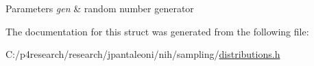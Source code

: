 \begin{DoxyParams}{\-Parameters}
{\em gen} & random number generator \\
\hline
\end{DoxyParams}


\-The documentation for this struct was generated from the following file\-:\begin{DoxyCompactItemize}
\item 
\-C\-:/p4research/research/jpantaleoni/nih/sampling/\hyperlink{distributions_8h}{distributions.\-h}\end{DoxyCompactItemize}
